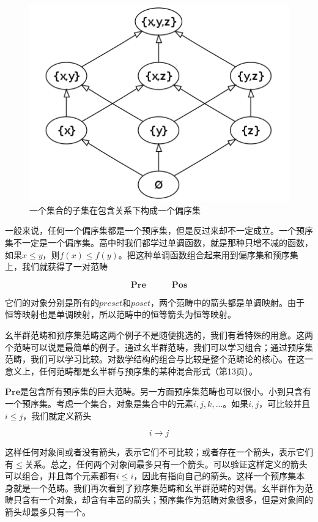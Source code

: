 \documentclass[b5paper]{ctexart}
\begin{document}
\begin{figure}[htbp]
 \centering
 \includegraphics[scale=0.4]{img/powerset.png}
 \caption{一个集合的子集在包含关系下构成一个偏序集}
 \label{fig:powerset}
\end{figure}

 
一般来说，任何一个偏序集都是一个预序集，但是反过来却不一定成立。一个预序集不一定是一个偏序集。高中时我们都学过单调函数，就是那种只增不减的函数，如果$x \leq y$，则$f(x) \leq f(y)$。把这种单调函数组合起来用到偏序集和预序集上，我们就获得了一对范畴

\[
\pmb{Pre} \quad \quad \quad \pmb{Pos}
\]

它们的对象分别是所有的$preset$和$poset$，两个范畴中的箭头都是单调映射。由于恒等映射也是单调映射，所以范畴中的恒等箭头为恒等映射。

幺半群范畴和预序集范畴这两个例子不是随便挑选的，我们有着特殊的用意。这两个范畴可以说是最简单的例子。通过幺半群范畴，我们可以学习组合；通过预序集范畴，我们可以学习比较。对数学结构的组合与比较是整个范畴论的核心。在这一意义上，任何范畴都是幺半群与预序集的某种混合形式（\cite{Simmons2011}第13页）。

$\pmb{Pre}$是包含所有预序集的巨大范畴。另一方面预序集范畴也可以很小。小到只含有一个预序集。考虑一个集合，对象是集合中的元素$i, j, k, ...$。如果$i, j$，可比较并且$i \leq j$，我们就定义箭头

\[
i \longrightarrow j
\]

这样任何对象间或者没有箭头，表示它们不可比较；或者存在一个箭头，表示它们有$\leq$关系。总之，任何两个对象间最多只有一个箭头。可以验证这样定义的箭头可以组合，并且每个元素都有$i \leq i$，因此有指向自己的箭头。这样一个预序集本身就是一个范畴。我们再次看到了预序集范畴和幺半群范畴的对偶。幺半群作为范畴只含有一个对象，却含有丰富的箭头；预序集作为范畴对象很多，但是对象间的箭头却最多只有一个。
\end{document}
